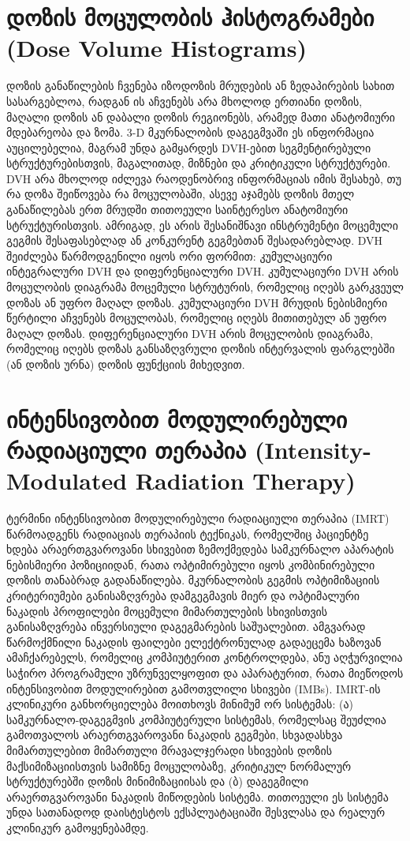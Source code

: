 \documentclass[12pt,a4paper,]{report}
\begin{document}
\section{დოზის მოცულობის ჰისტოგრამები (Dose Volume Histograms)}
დოზის განაწილების ჩვენება იზოდოზის მრუდების ან ზედაპირების სახით სასარგებლოა, რადგან ის აჩვენებს არა მხოლოდ ერთიანი დოზის, მაღალი დოზის ან დაბალი დოზის რეგიონებს, არამედ მათი ანატომიური მდებარეობა და ზომა. 3-D მკურნალობის დაგეგმვაში ეს ინფორმაცია აუცილებელია, მაგრამ უნდა გამყარდეს DVH-ებით სეგმენტირებული სტრუქტურებისთვის, მაგალითად, მიზნები და კრიტიკული სტრუქტურები. DVH არა მხოლოდ იძლევა რაოდენობრივ ინფორმაციას იმის შესახებ, თუ რა დოზა შეიწოვება რა მოცულობაში,  ასევე აჯამებს დოზის მთელ განაწილებას ერთ მრუდში თითოეული საინტერესო ანატომიური სტრუქტურისთვის.  ამრიგად, ეს არის შესანიშნავი ინსტრუმენტი მოცემული გეგმის შესაფასებლად ან კონკურენტ გეგმებთან შესადარებლად. DVH შეიძლება წარმოდგენილი იყოს ორი ფორმით: კუმულაციური ინტეგრალური DVH და დიფერენციალური DVH.  კუმულაციური DVH არის მოცულობის დიაგრამა მოცემული სტრუტურის, რომელიც იღებს გარკვეულ დოზას ან უფრო მაღალ დოზას. კუმულაციური DVH მრუდის ნებისმიერი წერტილი აჩვენებს მოცულობას, რომელიც იღებს მითითებულ ან უფრო მაღალ დოზას. დიფერენციალური DVH არის მოცულობის დიაგრამა, რომელიც იღებს დოზას განსაზღვრული დოზის ინტერვალის ფარგლებში (ან დოზის ურნა) დოზის ფუნქციის მიხედვით.

\section{ინტენსივობით მოდულირებული რადიაციული თერაპია (Intensity-Modulated Radiation Therapy)}
ტერმინი ინტენსივობით მოდულირებული რადიაციული თერაპია (IMRT) წარმოადგენს რადიაციას თერაპიის ტექნიკას, რომელშიც პაციენტზე ხდება არაერთგვაროვანი სხივებით ზემოქმედება სამკურნალო აპარატის ნებისმიერი პოზიციიდან, რათა ოპტიმირებული იყოს კომბინირებული დოზის  თანაბრად გადანაწილება. მკურნალობის გეგმის ოპტიმიზაციის კრიტერიუმები განისაზღვრება დამგეგმავის მიერ და ოპტიმალური ნაკადის პროფილები მოცემული მიმართულების სხივისთვის განისაზღვრება ინვერსიული დაგეგმარების საშუალებით. ამგვარად წარმოქმნილი ნაკადის ფაილები ელექტრონულად გადაეცემა ხაზოვან ამაჩქარებელს, რომელიც კომპიუტერით კონტროლდება, ანუ აღჭურვილია საჭირო პროგრამული უზრუნველყოფით და აპარატურით, რათა მიეწოდოს  ინტენსივობით მოდულირებით გამოთვლილი სხივები (IMBs).  IMRT-ის კლინიკური განხორციელება მოითხოვს მინიმუმ ორ სისტემას: (ა) სამკურნალო-დაგეგმვის კომპიუტერული სისტემას, რომელსაც შეუძლია გამოთვალოს არაერთგვაროვანი ნაკადის  გეგმები, სხვადასხვა მიმართულებით მიმართული მრავალჯერადი სხივების დოზის მაქსიმიზაციისთვის სამიზნე მოცულობაზე, კრიტიკულ ნორმალურ სტრუქტურებში დოზის მინიმიზაციისას და (ბ)  დაგეგმილი არაერთგვაროვანი ნაკადის მიწოდების სისტემა. თითოეული ეს სისტემა უნდა სათანადოდ დაისტესტოს ექსპლუატაციაში შესვლასა და რეალურ კლინიკურ გამოყენებამდე.
\end{document}
